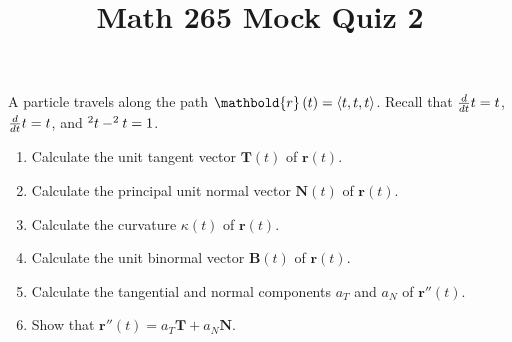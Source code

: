 \documentclass[12pt]{article}
\title{Math 265 Mock Quiz 2}\author{}\date{}
\let\cosh\relax\DeclareMathOperator{\cosh}{\mathsf{cosh}}
\let\sinh\relax\DeclareMathOperator{\sinh}{\mathsf{sinh}}
\begin{document}
\maketitle
\thispagestyle{empty}
A particle travels along the path
$\mathbold{r}\left(t\right)=\left\langle
t,\cosh{t},\sinh{t}\right\rangle$.
Recall that $\frac{d}{dt}\cosh{t}=\sinh{t}$,
$\frac{d}{dt}\sinh{t}=\cosh{t}$,
and $\cosh^2{t}-\sinh^2{t}=1$.
\begin{enumerate}
\item Calculate the unit tangent vector
$\mathbold{T}\left(t\right)$ of $\mathbold{r}\left(t\right)$.
\vspace{2in}
\item Calculate the principal unit normal vector
$\mathbold{N}\left(t\right)$ of $\mathbold{r}\left(t\right)$.
\vspace{2in}
\item Calculate the curvature $\kappa\left(t\right)$
of $\mathbold{r}\left(t\right)$.
\vspace{2in}
\item Calculate the unit binormal vector
$\mathbold{B}\left(t\right)$ of $\mathbold{r}\left(t\right)$.
\vspace{2in}
\item Calculate 
the tangential and normal components 
$a_T$ and $a_N$ of $\mathbold{r}''\left(t\right)$.
\vspace{2in}
\item Show that
$\mathbold{r}''\left(t\right)=a_T\mathbold{T}+a_N\mathbold{N}$.
\end{enumerate}
\end{document}
